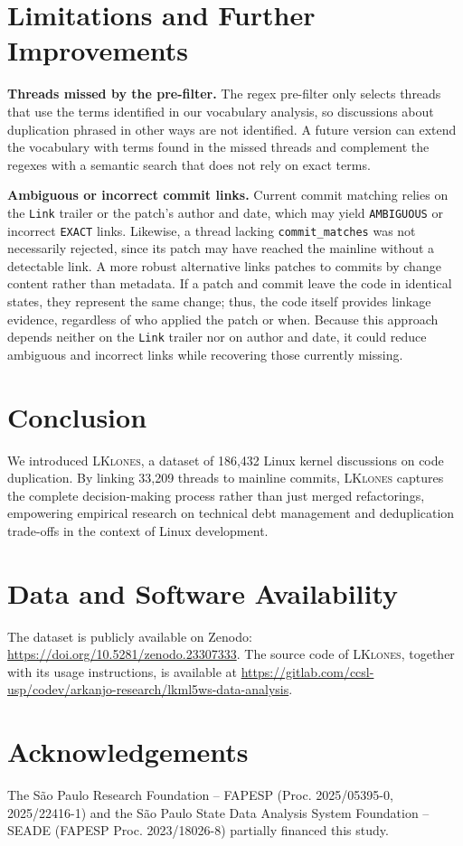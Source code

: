 \documentclass[10pt,conference]{IEEEtran}
\begin{document}
\section{Limitations and Further Improvements}\label{sec:limitations}

\textbf{Threads missed by the pre-filter.} The regex pre-filter only selects threads that use the terms identified in our vocabulary analysis, so discussions about duplication phrased in other ways are not identified. A future version can extend the vocabulary with terms found in the missed threads and complement the regexes with a semantic search that does not rely on exact terms.

\textbf{Ambiguous or incorrect commit links.} Current commit matching relies on the \texttt{Link} trailer or the patch's author and date, which may yield \texttt{AMBIGUOUS} or incorrect \texttt{EXACT} links. Likewise, a thread lacking \texttt{commit\_matches} was not necessarily rejected, since its patch may have reached the mainline without a detectable link. A more robust alternative links patches to commits by change content rather than metadata. If a patch and commit leave the code in identical states, they represent the same change; thus, the code itself provides linkage evidence, regardless of who applied the patch or when. Because this approach depends neither on the \texttt{Link} trailer nor on author and date, it could reduce ambiguous and incorrect links while recovering those currently missing.

\section{Conclusion}\label{sec:conclusion}

We introduced \textsc{LKlones}, a dataset of 186,432 Linux kernel discussions on code duplication. By linking 33,209 threads to mainline commits, \textsc{LKlones} captures the complete decision-making process rather than just merged refactorings, empowering empirical research on technical debt management and deduplication trade-offs in the context of Linux development.

\section*{Data and Software Availability}

The dataset is publicly available on Zenodo: \url{https://doi.org/10.5281/zenodo.23307333}. The source code of \textsc{LKlones}, together with its usage instructions, is available at \url{https://gitlab.com/ccsl-usp/codev/arkanjo-research/lkml5ws-data-analysis}.

\section*{Acknowledgements}

The São Paulo Research Foundation -- FAPESP (Proc. 2025/05395-0, 2025/22416-1) and the São Paulo State Data Analysis System Foundation -- SEADE (FAPESP Proc. 2023/18026-8) partially financed this study.

\clearpage



\end{document}
